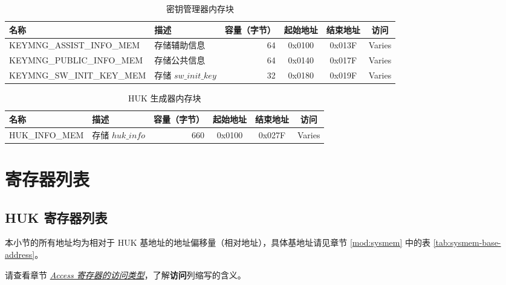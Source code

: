 \documentclass[main\_\_CN.tex]{subfiles}
\begin{document}
\begin{longtable}{ | p{4.6cm} | p{4cm} | r | c | c | c | }
\caption{密钥管理器内存块} \label{tab:keymng-mem-blocks}
\\ \hline
\rowcolor{lightgray}
\textbf{名称} & \textbf{描述}  &  \textbf{容量（字节）} &  \textbf{起始地址}  &  \textbf{结束地址}  & \textbf{访问}   \\ \hline
KEYMNG\_ASSIST\_INFO\_MEM\label{mem:keymng-assist-info} & 存储辅助信息 &   64  &  0x0100  &  0x013F  &  Varies  \\ \hline
KEYMNG\_PUBLIC\_INFO\_MEM\label{mem:keymng-public-info} & 存储公共信息    &   64  &  0x0140  &  0x017F  &  Varies  \\ \hline
KEYMNG\_SW\_INIT\_KEY\_MEM\label{mem:keymng-sw-init-key} & 存储 \begin{math}sw\_init\_key\end{math}  &   32  &  0x0180  &  0x019F  &  Varies  \\ \hline
\end{longtable}

\begin{longtable}{ | p{4.6cm} | p{4cm} | r | c | c | c | }
\caption{HUK 生成器内存块} \label{tab:huk-mem-blocks}
\\ \hline
\rowcolor{lightgray}
\textbf{名称} & \textbf{描述}  &  \textbf{容量（字节）} &  \textbf{起始地址}  &  \textbf{结束地址}  & \textbf{访问}  \\ \hline
HUK\_INFO\_MEM\label{mem:huk-info} & 存储 \hyperref[para:hukinfo]{\begin{math}huk\_info\end{math}}  &  660  &  0x0100  &  0x027F  &  Varies  \\ \hline
\end{longtable}

\hypertarget{keymng-reg-summ}{}
\section{寄存器列表}
\label{sec:keymng-reg-summ}

\subsection{HUK 寄存器列表}
本小节的所有地址均为相对于 HUK 基地址的地址偏移量（相对地址），具体基地址请见章节  \ref{mod:sysmem} \textit{} 中的表  \ref{tab:sysmem-base-address}。


请查看章节  \hyperref[glossary-access-types]{\textit{Access 寄存器的访问类型}}，了解\textbf{访问}列缩写的含义。
\end{document}
